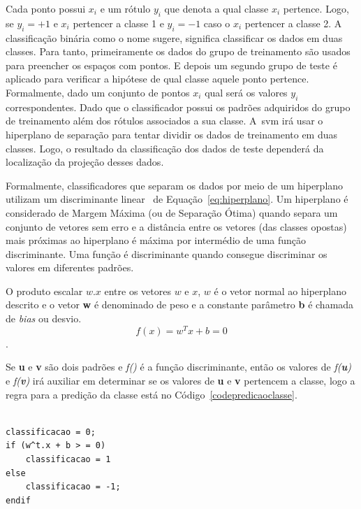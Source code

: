 Cada ponto possui $x_{i}$ e um rótulo $y_{i}$ que denota a qual classe $x_{i}$ pertence. Logo, se $y_{i} = + 1$ e $x_{i}$ pertencer a classe 1 e $y_{i} = - 1$ caso o $x_{i}$ pertencer a classe 2. A classificação binária como o nome sugere, significa classificar os dados em duas classes. Para tanto, primeiramente os dados do grupo de treinamento são usados para preencher os espaços com pontos. E depois um segundo grupo de teste é aplicado para verificar a hipótese de qual classe aquele ponto pertence. Formalmente, dado um conjunto de pontos $x_{i}$ qual será os valores $y_{i}$ correspondentes. Dado que o classificador possui os padrões adquiridos do grupo de treinamento além dos rótulos associados a sua classe. A~\ac{svm} irá usar o hiperplano de separação para tentar dividir os dados de treinamento em duas classes. Logo, o resultado da classificação dos dados de teste dependerá da localização da projeção desses dados.

Formalmente, classificadores que separam os dados por meio de um hiperplano utilizam um discriminante linear~\cite{valt2010} de Equação~\ref{eq:hiperplano}. Um hiperplano é considerado de Margem Máxima (ou de Separação Ótima) quando separa um conjunto de vetores sem erro e a distância entre os vetores (das classes opostas) mais próximas ao hiperplano é máxima por intermédio de uma função discriminante. Uma função é discriminante quando consegue discriminar os valores em diferentes padrões. 

O produto escalar $ w.x $ entre os vetores $ w $ e $ x $, $ w $ é o vetor normal ao hiperplano descrito e o vetor \textbf{w} é denominado de peso e a constante parâmetro \textbf{b} é chamada de \textit{bias} ou desvio.
\linebreak
\begin{equation}
f(x)=w^Tx+b=0
\label{eq:hiperplano}
\end{equation}.

Se \textbf{u} e \textbf{v} são dois padrões e \textit{f()} é a função discriminante, então os valores de \textit{f(\textbf{u})} e \textit{f(\textbf{v})} irá auxiliar em determinar se os valores de \textbf{u} e \textbf{v} pertencem a classe, logo a regra para a predição da classe está no Código~\ref{codepredicaoclasse}. 

\begin{lstlisting}[frame=single, caption=Código de Predição da Classes, label=codepredicaoclasse]  % Start your code-block

classificacao = 0;
if (w^t.x + b > = 0)
	classificacao = 1
else
	classificacao = -1;
endif
\end{lstlisting}

